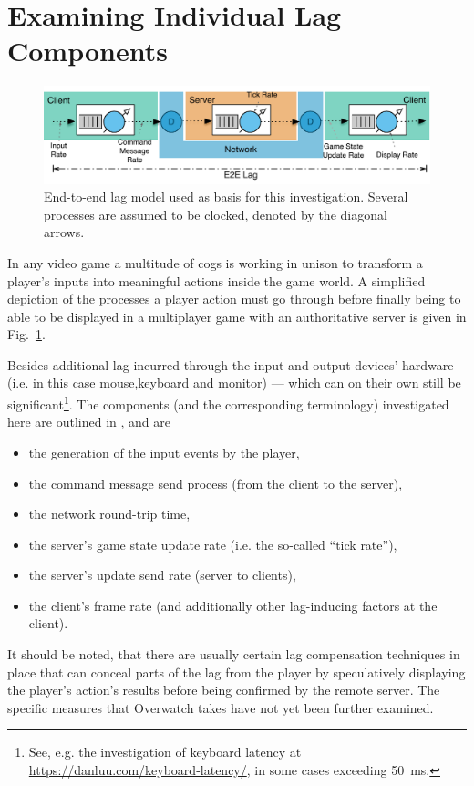 \section{Examining Individual Lag Components}
\label{sec:lagmodel}

\begin{figure}[t]
	\centering
	\includegraphics[width=1.0\textwidth]{images/e2e-lag-model.pdf}
	\caption{End-to-end lag model used as basis for this investigation. Several processes are assumed to be clocked, denoted by the diagonal arrows.}
\label{fig:e2e-lag-model}
\end{figure}

In any video game a multitude of cogs is working in unison to transform a player's inputs into meaningful actions inside the game world. A simplified depiction of the processes a player action must go through before finally being to able to be displayed in a multiplayer game with an authoritative server is given in Fig.~\ref{fig:e2e-lag-model}. 

Besides additional lag incurred through the input and output devices' hardware (i.e. in this case mouse,keyboard and monitor) --- which can on their own still be significant\footnote{See, e.g. the investigation of keyboard latency at \url{https://danluu.com/keyboard-latency/}, in some cases exceeding \SI{50}{\milli\second}.}. The components (and the corresponding terminology) investigated here are outlined in \cite{Metzger+2016}, and are 
%
\begin{itemize}
	\item the generation of the input events by the player,
	\item the command message send process (from the client to the server),
	\item the network round-trip time,
	\item the server's game state update rate (i.e. the so-called ``tick rate''),
	\item the server's update send rate (server to clients),
	\item the client's frame rate (and additionally other lag-inducing factors at the client).
\end{itemize}
%
It should be noted, that there are usually certain lag compensation techniques \cite{bernier2001latency} in place that can conceal parts of the lag from the player by speculatively displaying the player's action's results before being confirmed by the remote server. The specific measures that Overwatch takes have not yet been further examined.

